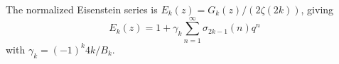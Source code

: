 The normalized Eisenstein series is $E_k(z) = G_k(z) / (2\zeta(2k))$, giving
$$E_k(z) = 1 + \gamma_k \sum_{n=1}^{\infty} \sigma_{2k-1}(n) q^n$$
with $\gamma_k = (-1)^k 4k/B_k$.
